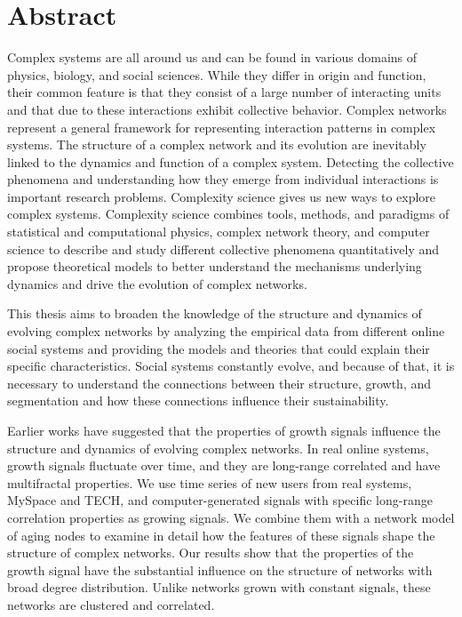 
\normalsize

\chapter{Abstract}

Complex systems are all around us and can be found in various domains of physics, biology, and social sciences. While they differ in origin and function, their common feature is that they consist of a large number of interacting units and that due to these interactions exhibit collective behavior. Complex networks represent a general framework for representing interaction patterns in complex systems. The structure of a complex network and its evolution are inevitably linked to the dynamics and function of a complex system. Detecting the collective phenomena and understanding how they emerge from individual interactions is  important research problems. Complexity science gives us new ways to explore complex systems. Complexity science combines tools, methods, and paradigms of statistical and computational physics, complex network theory, and computer science to describe and study different collective phenomena quantitatively and propose theoretical models to better understand the mechanisms underlying dynamics and drive the evolution of complex networks.

This thesis aims to broaden the knowledge of the structure and dynamics of evolving complex networks by analyzing the empirical data from different online social systems and providing the models and theories that could explain their specific characteristics. Social systems constantly evolve, and because of that, it is necessary to understand the connections between their structure, growth, and segmentation and how these connections influence their sustainability.

Earlier works have suggested that the properties of growth signals influence the structure and dynamics of evolving complex networks. In real online systems, growth signals fluctuate over time, and they are long-range correlated and have multifractal properties. We use time series of new users from real systems, MySpace and TECH, and computer-generated signals with specific long-range correlation properties as growing signals. We combine them with a network model of aging nodes to examine in detail how the features of these signals shape the structure of complex networks. Our results show that the properties of the growth signal have the substantial influence on the structure of networks with broad degree distribution. Unlike networks grown with constant signals, these networks are clustered and correlated.

